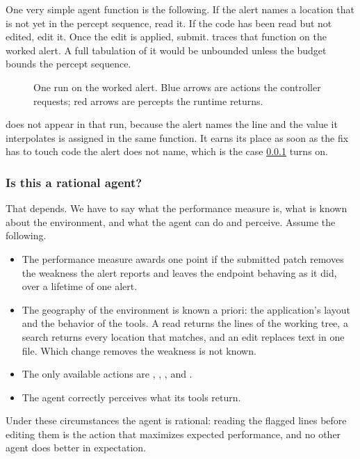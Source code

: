 One very simple agent function is the following. If the alert names a location that is not yet
in the percept sequence, read it. If the code has been read but not edited, edit it. Once the
edit is applied, submit.  traces that function on the worked alert.
A full tabulation of it would be unbounded unless the budget bounds the percept sequence.

\begin{figure}[htbp]
  \centering
  \resizebox{\linewidth}{!}{}
  \caption{One run on the worked alert. Blue arrows are actions the controller requests; red
  arrows are percepts the runtime returns.}
  \label{fig:agents-sequence}
\end{figure}

 does not appear in that run, because the alert names the line and the value it
interpolates is assigned in the same function. It earns its place as soon as the fix has to
touch code the alert does not name, which is the case \cref{sec:agents-rational-limits} turns
on.

\subsubsection{Is this a rational agent?}
\label{sec:agents-rational-limits}
That depends. We have to say what the performance measure is, what is known about the
environment, and what the agent can do and perceive. Assume the following.
\begin{itemize}
  \item The performance measure awards one point if the submitted patch removes the weakness the
  alert reports and leaves the endpoint behaving as it did, over a lifetime of one alert.
  \item The geography of the environment is known a priori: the application's layout and the
  behavior of the tools. A read returns the lines of the working tree, a search returns every
  location that matches, and an edit replaces text in one file. Which change removes the
  weakness is not known.
  \item The only available actions are , , ,
  and .
  \item The agent correctly perceives what its tools return.
\end{itemize}
Under these circumstances the agent is rational: reading the flagged lines before editing them
is the action that maximizes expected performance, and no other agent does better in
expectation.


